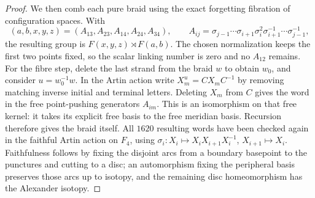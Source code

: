 \begin{proof}
We then comb each pure braid using the exact forgetting fibration of
configuration spaces.  With
\[
 (a,b,x,y,z)=(A_{13},A_{23},A_{14},A_{24},A_{34}),\qquad
 A_{ij}=\sigma_{j-1}\cdots\sigma_{i+1}\sigma_i^2
                \sigma_{i+1}^{-1}\cdots\sigma_{j-1}^{-1},
\]
the resulting group is $F(x,y,z)\rtimes F(a,b)$.
The chosen normalization keeps the first two points fixed, so the
scalar linking number is zero and no $A_{12}$ remains.
For the fibre step, delete the last strand from the braid $w$ to obtain
$w_0$, and consider $u=w_0^{-1}w$.
In the Artin action write $X_m^u=C X_m C^{-1}$ by removing matching
inverse initial and terminal letters.  Deleting $X_m$ from $C$ gives
the word in the free point-pushing generators $A_{im}$.  This is an
isomorphism on that free kernel: it takes its explicit free basis to
the free meridian basis.  Recursion therefore gives the braid itself.
All $1620$ resulting words have been checked again in the faithful
Artin action on $F_4$, using
$\sigma_i:X_i\mapsto X_iX_{i+1}X_i^{-1}$,
$X_{i+1}\mapsto X_i$.
Faithfulness follows by fixing the disjoint arcs from a boundary
basepoint to the punctures and cutting to a disc; an automorphism
fixing the peripheral basis preserves those arcs up to isotopy, and
the remaining disc homeomorphism has the Alexander isotopy.


\end{proof}

